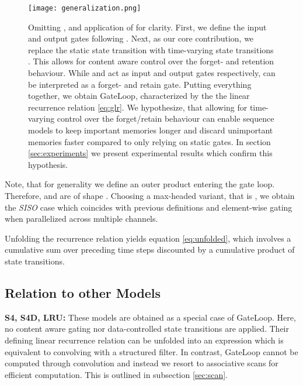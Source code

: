 \documentclass{article} \usepackage{iclr2024_conference,times}
\begin{document}
\begin{figure}[H]
\begin{center}
\texttt{[image: generalization.png]}
\end{center}
\caption{Omitting ,  and application of  for clarity. First, we define the input and output gates  following \cite{sun2023retentive}. Next, as our core contribution, we replace the static state transition with time-varying state transitions . This allows for content aware control over the forget- and retention behaviour. While  and  act as input and output gates respectively,  can be interpreted as a forget- and retain gate. Putting everything together, we obtain GateLoop, characterized by the the linear recurrence relation \ref{eq:glr}. We hypothesize, that allowing for time-varying control over the forget/retain behaviour can enable sequence models to keep important memories longer and discard unimportant memories faster compared to only relying on static gates. In section \ref{sec:experiments} we present experimental results which confirm this hypothesis.}
\label{fig:generalization}
\vspace{-2em}
\end{figure}

\vspace{0.3em}
Note, that for generality we define an outer product  entering the gate loop. Therefore,  and  are of shape . Choosing a max-headed variant, that is , we obtain the \textit{SISO} case which coincides with previous definitions and element-wise gating when parallelized across multiple channels. 

Unfolding the recurrence relation yields equation \ref{eq:unfolded}, which involves a cumulative sum over preceding time steps discounted by a cumulative product of state transitions. 
\vspace{0.3em}


\newpage

\subsection{Relation to other Models}

\textbf{S4, S4D, LRU:} These models are obtained as a special case of GateLoop. Here, no content aware gating nor data-controlled state transitions are applied. Their defining linear recurrence relation can be unfolded into an expression which  is equivalent to convolving  with a structured filter. In contrast, GateLoop cannot be computed through convolution and instead we resort to associative scans for efficient computation. This is outlined in subsection \ref{sec:scan}.
\end{document}
